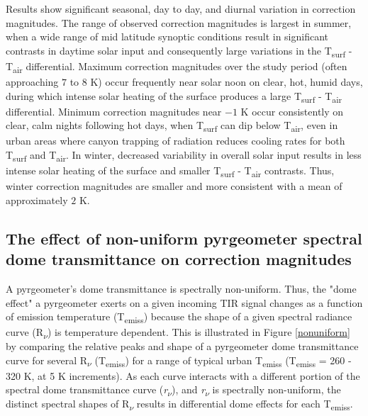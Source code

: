 \begin{bibunit}
Results show significant seasonal, day to day, and diurnal variation in correction magnitudes. The range of observed correction magnitudes is largest in summer, when a wide range of mid latitude synoptic conditions result in significant contrasts in daytime solar input and consequently large variations in the T\textsubscript{surf} - T\textsubscript{air} differential. Maximum correction magnitudes over the study period (often approaching $7$ to $8$ \si{\kelvin}) occur frequently near solar noon on clear, hot, humid days, during which intense solar heating of the surface produces a large T\textsubscript{surf} - T\textsubscript{air} differential. Minimum correction magnitudes near $-1$ \si{\kelvin} occur consistently on clear, calm nights following hot days, when T\textsubscript{surf} can dip below T\textsubscript{air}, even in urban areas where canyon trapping of radiation reduces cooling rates for both T\textsubscript{surf} and T\textsubscript{air}. In winter, decreased variability in overall solar input results in less intense solar heating of the surface and smaller T\textsubscript{surf} - T\textsubscript{air} contrasts. Thus, winter correction magnitudes are smaller and more consistent with a mean of approximately $2$ \si{\kelvin}.

\subsection{The effect of non-uniform pyrgeometer spectral dome transmittance on correction magnitudes}\label{Persistence in correction magnitudes}

A pyrgeometer's dome transmittance is spectrally non-uniform. Thus, the "dome effect" a pyrgeometer exerts on a given incoming TIR signal changes as a function of emission temperature (T\textsubscript{emiss}) because the shape of a given spectral radiance curve (R\textsubscript{$\nu$}) is temperature dependent. This is illustrated in Figure \ref{nonuniform} by comparing the relative peaks and shape of a pyrgeometer dome transmittance curve for several R\textsubscript{$\nu$} (T\textsubscript{emiss}) for a range of typical urban T\textsubscript{emiss} (T\textsubscript{emiss} = 260 - 320 \si{\kelvin}, at 5 \si{\kelvin} increments). As each curve interacts with a different portion of the spectral dome transmittance curve (\textit{r\textsubscript{$\nu$}}), and \textit{r\textsubscript{$\nu$}} is spectrally non-uniform, the distinct spectral shapes of R\textsubscript{$\nu$} results in differential dome effects for each T\textsubscript{emiss}.


\end{bibunit}
